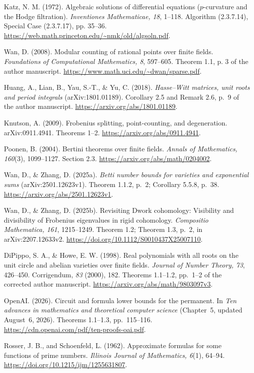 Katz, N. M. (1972). Algebraic solutions of differential equations ($p$-curvature and the Hodge filtration). \emph{Inventiones Mathematicae, 18}, 1--118. Algorithm (2.3.7.14), Special Case (2.3.7.17), pp. 35--36. \url{https://web.math.princeton.edu/~nmk/old/algsoln.pdf}.

Wan, D. (2008). Modular counting of rational points over finite fields. \emph{Foundations of Computational Mathematics, 8}, 597--605. Theorem 1.1, p. 3 of the author manuscript. \url{https://www.math.uci.edu/~dwan/sparse.pdf}.

Huang, A., Lian, B., Yau, S.-T., \& Yu, C. (2018). \emph{Hasse--Witt matrices, unit roots and period integrals} (arXiv:1801.01189). Corollary 2.5 and Remark 2.6, p.~9 of the author manuscript. \url{https://arxiv.org/abs/1801.01189}.

Knutson, A. (2009). Frobenius splitting, point-counting, and degeneration. arXiv:0911.4941. Theorems 1--2. \url{https://arxiv.org/abs/0911.4941}.

Poonen, B. (2004). Bertini theorems over finite fields. \emph{Annals of Mathematics, 160}(3), 1099--1127. Section 2.3. \url{https://arxiv.org/abs/math/0204002}.

Wan, D., \& Zhang, D. (2025a). \emph{Betti number bounds for varieties and exponential sums} (arXiv:2501.12623v1). Theorem 1.1.2, p.~2; Corollary 5.5.8, p.~38. \url{https://arxiv.org/abs/2501.12623v1}.

Wan, D., \& Zhang, D. (2025b). Revisiting Dwork cohomology: Visibility and divisibility of Frobenius eigenvalues in rigid cohomology. \emph{Compositio Mathematica, 161}, 1215--1249. Theorem 1.2; Theorem 1.3, p.~2, in arXiv:2207.12633v2. \url{https://doi.org/10.1112/S0010437X25007110}.

DiPippo, S. A., \& Howe, E. W. (1998). Real polynomials with all roots on the unit circle and abelian varieties over finite fields. \emph{Journal of Number Theory, 73}, 426--450. Corrigendum, \emph{83} (2000), 182. Theorems 1.1--1.2, pp.~1--2 of the corrected author manuscript. \url{https://arxiv.org/abs/math/9803097v3}.

OpenAI. (2026). Circuit and formula lower bounds for the permanent. In \emph{Ten advances in mathematics and theoretical computer science} (Chapter~5, updated August~6, 2026). Theorems 1.1--1.3, pp.~115--116. \url{https://cdn.openai.com/pdf/ten-proofs-oai.pdf}.

Rosser, J. B., and Schoenfeld, L. (1962).
Approximate formulas for some functions of prime numbers.
\emph{Illinois Journal of Mathematics, 6}(1), 64--94.
\url{https://doi.org/10.1215/ijm/1255631807}.
